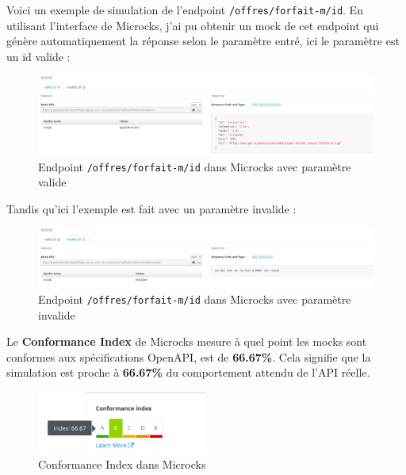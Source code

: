 \documentclass{article}
\begin{document}
	Voici un exemple de simulation de l'endpoint \texttt{/offres/forfait-m/{id}}. En utilisant l'interface de Microcks, j'ai pu obtenir un mock de cet endpoint qui génère automatiquement la réponse selon le paramètre entré, ici le paramètre est un id valide : 
	
	\begin{figure}[H]
		\centering
		\includegraphics[width=\textwidth]{asset/mock_forfaitm.png}
		\caption{Endpoint \texttt{/offres/forfait-m/{id}} dans Microcks avec paramètre valide}
		\label{fig:endpoint-offres/forfait-m/{id}}
	\end{figure}
	
	Tandis qu'ici l'exemple est fait avec un paramètre invalide :
	
		\begin{figure}[H]
		\centering
		\includegraphics[width=\textwidth]{asset/microcks_invalid.png}
		\caption{Endpoint \texttt{/offres/forfait-m/{id}} dans Microcks avec paramètre invalide}
		\label{fig:endpoint-offres/forfait-m/{id}}
	\end{figure}
	
	Le \textbf{Conformance Index} de Microcks mesure à quel point les mocks sont conformes aux spécifications OpenAPI, est de \textbf{66.67\%}. Cela signifie que la simulation est proche à \textbf{66.67\%} du comportement attendu de l'API réelle.
	
	\begin{figure}[H]
		\centering
		\includegraphics[width=0.5\textwidth]{asset/conformance-index.png}
		\caption{Conformance Index dans Microcks}
		\label{fig:conformance-index}
	\end{figure}
	
\end{document}
